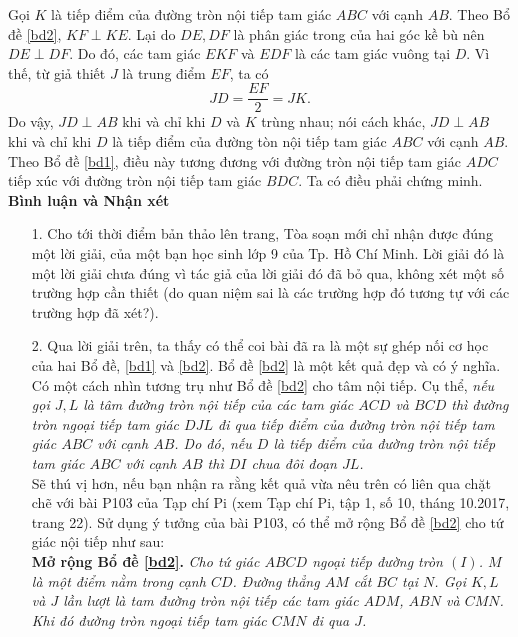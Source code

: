 \begin{bt}
{\begin{center}
		\end{center}
		Gọi $K$ là tiếp điểm của đường tròn nội tiếp tam giác $ABC$ với cạnh $AB$. Theo Bổ đề \ref{bd2}, $KF\perp KE$. Lại do $DE, DF$ là phân giác trong của hai góc kề bù nên $DE\perp DF$. Do đó, các tam giác $EKF$ và $EDF$ là các tam giác vuông tại $D$. Vì thế, từ giả thiết $J$ là trung điểm $EF$, ta có
		$$JD=\dfrac{EF}{2}=JK.$$
		Do vậy, $JD\perp AB$ khi và chỉ khi $D$ và $K$ trùng nhau; nói cách khác, $JD\perp AB$ khi và chỉ khi $D$ là tiếp điểm của đường tòn nội tiếp tam giác $ABC$ với cạnh $AB$. Theo Bổ đề \ref{bd1}, điều này tương đương với đường tròn nội tiếp tam giác $ADC$ tiếp xúc với đường tròn nội tiếp tam giác $BDC$. Ta có điều phải chứng minh.\\
		\textbf{Bình luận và Nhận xét}
		\begin{itemize}
			\item[1.] Cho tới thời điểm bản thảo lên trang, Tòa soạn mới chỉ nhận được đúng một lời giải, của một bạn học sinh lớp 9 của Tp. Hồ Chí Minh. Lời giải đó là một lời giải chưa đúng vì tác giả của lời giải đó đã bỏ qua, không xét một số trường hợp cần thiết (do quan niệm sai là các trường hợp đó tương tự với các trường hợp đã xét?).
			\item[2.] Qua lời giải trên, ta thấy có thể coi bài đã ra là một sự ghép nối cơ học của hai Bổ đề, \ref{bd1} và \ref{bd2}. Bổ đề \ref{bd2} là một kết quả đẹp và có ý nghĩa. Có một cách nhìn tương trụ như Bổ đề \ref{bd2} cho tâm nội tiếp. Cụ thể, \textit{nếu gọi $J, L$ là tâm đường tròn nội tiếp của các tam giác $ACD$ và $BCD$ thì đường tròn ngoại tiếp tam giác $DJL$ đi qua tiếp điểm của đường tròn nội tiếp tam giác $ABC$ với cạnh $AB$. Do đó, nếu $D$ là tiếp điểm của đường tròn nội tiếp tam giác $ABC$ với cạnh $AB$ thì $DI$ chua đôi đoạn $JL$.}\\
			Sẽ thú vị hơn, nếu bạn nhận ra rằng kết quả vừa nêu trên có liên qua chặt chẽ với bài P103 của Tạp chí Pi (xem Tạp chí Pi, tập 1, số 10, tháng 10.2017, trang 22). Sử dụng ý tưởng của bài P103, có thể mở rộng Bổ đề \ref{bd2} cho tứ giác nội tiếp như sau:\\
			\textbf{Mở rộng Bổ đề \ref{bd2}.} \textit{Cho tứ giác $ABCD$ ngoại tiếp đường tròn $(I)$. $M$ là một điểm nằm trong cạnh $CD$. Đường thẳng $AM$ cắt $BC$ tại $N$. Gọi $K, L$ và $J$ lần lượt là tam đường tròn nội tiếp các tam giác $ADM$, $ABN$ và $CMN$. Khi đó đường tròn ngoại tiếp tam giác $CMN$ đi qua $J$.}

\end{itemize}}
\end{bt}
